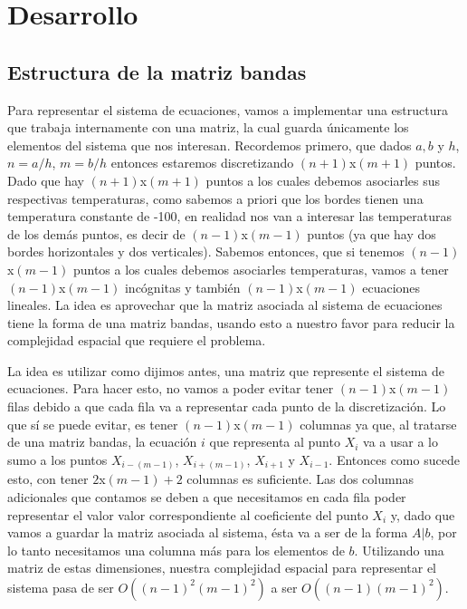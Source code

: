 \section{Desarrollo}
\subsection{Estructura de la matriz bandas}
Para representar el sistema de ecuaciones, vamos a implementar una estructura que trabaja internamente con una matriz, la cual guarda únicamente los elementos del sistema que nos interesan. Recordemos primero, que dados $a, b$ y $h$, $n = a/h$, $m = b/h$ entonces estaremos discretizando $(n + 1)$x$(m + 1)$ puntos. 
Dado que hay $(n + 1)$x$(m + 1)$ puntos a los cuales debemos asociarles sus respectivas temperaturas, como sabemos a priori que los bordes tienen una temperatura constante de -100, en realidad nos van a interesar las temperaturas de los demás puntos, es decir de $(n - 1)$x$(m - 1)$ puntos (ya que hay dos bordes horizontales y dos verticales). Sabemos entonces, que si tenemos $(n - 1)$x$(m - 1)$ puntos a los cuales debemos asociarles temperaturas, vamos a tener $(n - 1)$x$(m - 1)$ incógnitas y también $(n - 1)$x$(m - 1)$ ecuaciones lineales. La idea es aprovechar que la matriz asociada al sistema de ecuaciones tiene la forma de una matriz bandas, usando esto a nuestro favor para reducir la complejidad espacial que requiere el problema.
\par La idea es utilizar como dijimos antes, una matriz que represente el sistema de ecuaciones. Para hacer esto, no vamos a poder evitar tener $(n - 1)$x$(m - 1)$ filas debido a que cada fila va a representar cada punto de la discretización. Lo que sí se puede evitar, es tener $(n - 1)$x$(m - 1)$ columnas ya que, al tratarse de una matriz bandas, la ecuación $i$ que representa al punto $X_i$ va a usar a lo sumo a los puntos $X_{i - (m - 1)}$, $X_{i + (m - 1)}$, $X_{i + 1}$ y $X_{i - 1}$. Entonces como sucede esto, con tener $2$x$(m - 1) + 2$ columnas es suficiente. Las dos columnas adicionales que contamos se deben a que necesitamos en cada fila poder representar el valor valor correspondiente al coeficiente del punto $X_i$ y, dado que vamos a guardar la matriz asociada al sistema, ésta va a ser de la forma $A|b$, por lo tanto necesitamos una columna más para los elementos de $b$. Utilizando una matriz de estas dimensiones, nuestra complejidad espacial para representar el sistema pasa de ser $O((n - 1)^2(m - 1)^2)$ a ser $O((n - 1)(m - 1)^2)$.
